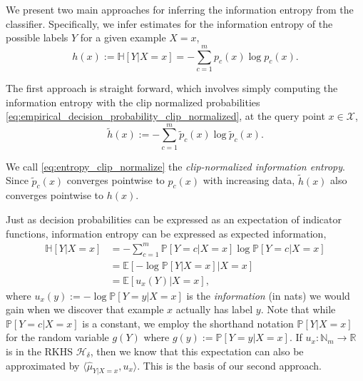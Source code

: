\documentclass[runningheads, envcountsame, a4paper]{llncs}
\begin{document}
		We present two main approaches for inferring the information entropy from the classifier. Specifically, we infer estimates for the information entropy of the possible labels $Y$ for a given example $X = x$,
		\begin{equation}
			h(x) := \mathbb{H}[Y | X = x] = - \sum_{c = 1}^{m} p_{c}(x) \log{p_{c}(x)}.
		\end{equation}
		
		The first approach is straight forward, which involves simply computing the information entropy with the clip normalized probabilities \eqref{eq:empirical_decision_probability_clip_normalized}, at the query point $x \in \mathcal{X}$,
		\begin{equation}
			\tilde{h}(x) := - \sum_{c = 1}^{m} \tilde{p}_{c}(x) \log{\tilde{p}_{c}(x)}.
		\label{eq:entropy_clip_normalize}
		\end{equation}
		
		We call \eqref{eq:entropy_clip_normalize} the \textit{clip-normalized information entropy}. Since $\tilde{p}_{c}(x)$ converges pointwise to $p_{c}(x)$ with increasing data, $\tilde{h}(x)$ also converges pointwise to $h(x)$.
		
		Just as decision probabilities can be expressed as an expectation of indicator functions, information entropy can be expressed as expected information,
		\begin{equation}
		\begin{aligned}
			\mathbb{H}[Y | X = x] &= - \sum_{c = 1}^{m} \mathbb{P}[Y = c| X = x] \log{\mathbb{P}[Y = c | X = x]} \\
			&= \mathbb{E}[- \log{\mathbb{P}[Y | X = x]} | X = x] \\
			&= \mathbb{E}[u_{x}(Y) | X = x],
		\end{aligned}
		\end{equation}
		where $u_{x}(y) := - \log{\mathbb{P}[Y = y | X = x]}$ is the \textit{information} (in nats) we would gain when we discover that example $x$ actually has label $y$. Note that while $\mathbb{P}[Y = c | X = x]$ is a constant, we employ the shorthand notation $\mathbb{P}[Y| X = x]$ for the random variable $g(Y)$ where $g(y) := \mathbb{P}[Y = y | X = x]$. If $u_{x} : \mathbb{N}_{m} \to \mathbb{R}$ is in the \gls{RKHS} $\mathcal{H}_{\delta}$, then we know that this expectation can also be approximated by $\langle \hat{\mu}_{Y | X = x}, u_{x} \rangle$. This is the basis of our second approach.
		
\end{document}
